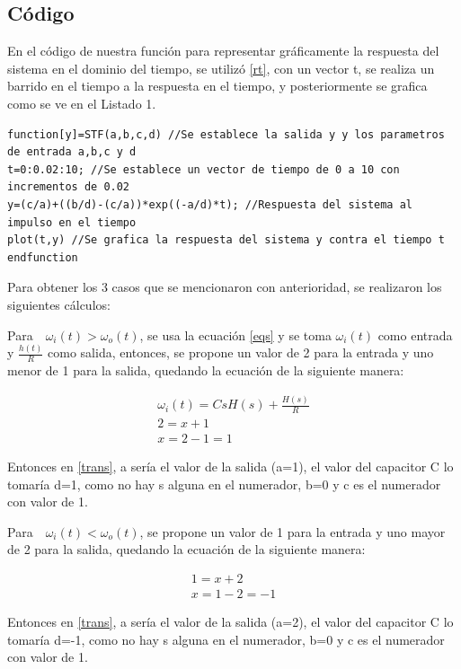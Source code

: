 \documentclass{article}
\begin{document}
	 \subsection{Código}
	 En el código de nuestra función para representar gráficamente la respuesta del sistema en el dominio del tiempo, se utilizó \eqref{rt}, con un vector t, se realiza un barrido en el tiempo a la respuesta en el tiempo, y posteriormente se grafica como se ve en el Listado 1.
	 \lstset{language=Scilab}
	 \begin{lstlisting}[frame=single]
function[y]=STF(a,b,c,d) //Se establece la salida y y los parametros de entrada a,b,c y d
t=0:0.02:10; //Se establece un vector de tiempo de 0 a 10 con incrementos de 0.02
y=(c/a)+((b/d)-(c/a))*exp((-a/d)*t); //Respuesta del sistema al impulso en el tiempo
plot(t,y) //Se grafica la respuesta del sistema y contra el tiempo t
endfunction 
	 \end{lstlisting} 
	 
	 Para obtener los 3 casos que se mencionaron con anterioridad, se realizaron los siguientes cálculos:

	 Para$\quad \omega_i(t)>\omega_o(t)$, se usa la ecuación \eqref{eqs} y se toma $ \omega_i(t) $ como entrada y $ \frac{h(t)}{R} $ como salida, entonces, se propone un valor de 2 para la entrada y uno menor de 1 para la salida, quedando la ecuación de la siguiente manera:
	 
	 \begin{align}
	\omega_i(t)= CsH(s)+ \frac{H(s)}{R}\\
	2= x+1\\
	x=2-1=1
	 \end{align}
	 
	 Entonces en \eqref{trans}, a sería el valor de la salida (a=1), el valor del capacitor C lo tomaría d=1, como no hay s alguna en el numerador, b=0 y c es el numerador con valor de 1.
	 
	  Para$\quad \omega_i(t)<\omega_o(t)$, se propone un valor de 1 para la entrada y uno mayor de 2 para la salida, quedando la ecuación de la siguiente manera:
	 
	 \begin{align}
	 1= x+2\\
	 x=1-2=-1
	 \end{align}
	 
	 Entonces en \eqref{trans}, a sería el valor de la salida (a=2), el valor del capacitor C lo tomaría d=-1, como no hay s alguna en el numerador, b=0 y c es el numerador con valor de 1.
	 
\end{document}
